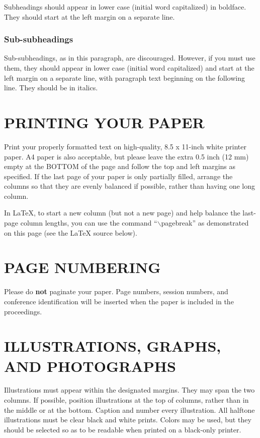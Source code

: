 \documentclass{article}
\begin{document}
Subheadings should appear in lower case (initial word capitalized) in
boldface.  They should start at the left margin on a separate line.
 
\subsubsection{Sub-subheadings}
\label{sssec:subsubhead}

Sub-subheadings, as in this paragraph, are discouraged. However, if you
must use them, they should appear in lower case (initial word
capitalized) and start at the left margin on a separate line, with paragraph
text beginning on the following line.  They should be in italics.

\section{PRINTING YOUR PAPER}
\label{sec:print}

Print your properly formatted text on high-quality, 8.5 x 11-inch white printer
paper. A4 paper is also acceptable, but please leave the extra 0.5 inch (12 mm)
empty at the BOTTOM of the page and follow the top and left margins as
specified.  If the last page of your paper is only partially filled, arrange
the columns so that they are evenly balanced if possible, rather than having
one long column.

In LaTeX, to start a new column (but not a new page) and help balance the
last-page column lengths, you can use the command ``$\backslash$pagebreak'' as
demonstrated on this page (see the LaTeX source below).

\section{PAGE NUMBERING}
\label{sec:page}

Please do {\bf not} paginate your paper.  Page numbers, session numbers, and
conference identification will be inserted when the paper is included in the
proceedings.

\section{ILLUSTRATIONS, GRAPHS, AND PHOTOGRAPHS}
\label{sec:illust}

Illustrations must appear within the designated margins.  They may span the two
columns.  If possible, position illustrations at the top of columns, rather
than in the middle or at the bottom.  Caption and number every illustration.
All halftone illustrations must be clear black and white prints.  Colors may be
used, but they should be selected so as to be readable when printed on a
black-only printer.
\end{document}
